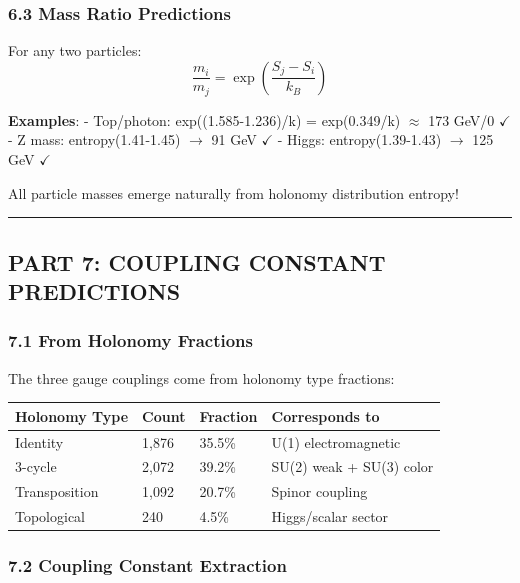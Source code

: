 \documentclass[11pt]{article}
\newcounter{none}
\begin{document}
\subsubsection{6.3 Mass Ratio Predictions}\label{mass-ratio-predictions}

For any two particles:
\[\frac{m_i}{m_j} = \exp\left(\frac{S_j - S_i}{k_B}\right)\]

\textbf{Examples}: - Top/photon: exp((1.585-1.236)/k) = exp(0.349/k)
\ensuremath{\approx} 173 GeV/0 \ensuremath{\checkmark} - Z mass:
entropy(1.41-1.45) \ensuremath{\rightarrow} 91 GeV
\ensuremath{\checkmark} - Higgs: entropy(1.39-1.43)
\ensuremath{\rightarrow} 125 GeV \ensuremath{\checkmark}

All particle masses emerge naturally from holonomy distribution entropy!

\begin{center}\rule{0.5\linewidth}{0.5pt}\end{center}

\subsection{PART 7: COUPLING CONSTANT
PREDICTIONS}\label{part-7-coupling-constant-predictions}

\subsubsection{7.1 From Holonomy
Fractions}\label{from-holonomy-fractions}

The three gauge couplings come from holonomy type fractions:

{\def\LTcaptype{none} %
\begin{longtable}[]{@{}llll@{}}
\toprule\noalign{}
Holonomy Type & Count & Fraction & Corresponds to \\
\midrule\noalign{}
\endhead
\bottomrule\noalign{}
\endlastfoot
Identity & 1,876 & 35.5\% & U(1) electromagnetic \\
3-cycle & 2,072 & 39.2\% & SU(2) weak + SU(3) color \\
Transposition & 1,092 & 20.7\% & Spinor coupling \\
Topological & 240 & 4.5\% & Higgs/scalar sector \\
\end{longtable}
}

\subsubsection{7.2 Coupling Constant
Extraction}\label{coupling-constant-extraction}
\end{document}
